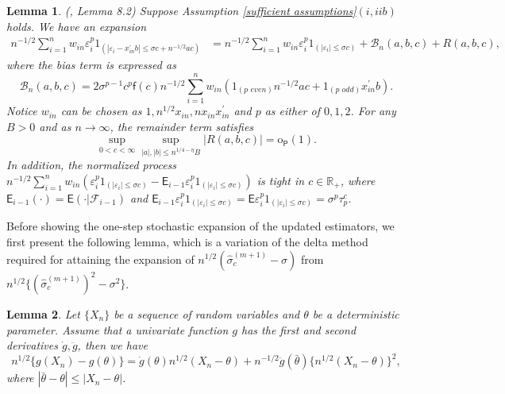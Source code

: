 \documentclass[11pt, letterpaper]{article}
\newtheorem{lemma}{Lemma}
\numberwithin{algorithm}{section}
\numberwithin{assumption}{section}
\numberwithin{lemma}{section}
\numberwithin{theorem}{section}
\numberwithin{corollary}{section}
\numberwithin{remark}{section}
\numberwithin{equation}{section}
\numberwithin{figure}{section}
\numberwithin{table}{section}
\begin{document}
\begin{lemma} \label{asymptotic expansion and tightness of two-sided empirical processes}
(\cite{jiao2020testingoutlier}, Lemma 8.2) Suppose Assumption \ref{sufficient assumptions}$(i, iib)$ holds. We have an expansion
\begin{align*}
n^{-1/2} \sum_{i=1}^{n} w_{in} \varepsilon_{i}^{p} 1_{( |\varepsilon_{i} - x_{in}^{\prime}b| \le \sigma c + n^{-1/2} a c )} & = n^{-1/2} \sum_{i=1}^{n} w_{in} \varepsilon_{i}^{p} 1_{(|\varepsilon_{i}| \le \sigma c)} + \mathcal{B}_{n}(a, b, c) + R(a, b, c),
\end{align*}
where the bias term is expressed as
\begin{equation*}
\mathcal{B}_{n}(a, b, c) = 2 \sigma^{p - 1} c^{p} \mathsf{f}(c) n^{-1/2} \sum_{i=1}^{n} w_{in} ( 1_{(p \,\, even)} n^{-1/2} a c  + 1_{(p \,\, odd)} x_{in}^{\prime} b ).
\end{equation*}
Notice $w_{in}$ can be chosen as $1, n^{1/2} x_{in}, n x_{in} x_{in}^{\prime}$ and $p$ as either of $0, 1, 2$. For any $B > 0$ and as $n \to \infty$, the remainder term satisfies
\begin{equation*}
\sup_{0 < c < \infty} \sup_{|a|, |b| \le n^{1/4 - \eta} B} |R(a, b, c)| = \mathrm{o}_{\mathsf{P}}(1).
\end{equation*}
In addition, the normalized process $n^{-1/2} \sum_{i=1}^{n} w_{in} (\varepsilon_{i}^{p} 1_{( |\varepsilon_{i}| \le \sigma c)} - \mathsf{E}_{i - 1} \varepsilon_{i}^{p} 1_{( |\varepsilon_{i}| \le \sigma c)})$ is tight in $c \in \mathbb{R}_{+}$, where $\mathsf{E}_{i - 1}(\cdot) = \mathsf{E}(\cdot | \mathcal{F}_{i - 1})$ and $\mathsf{E}_{i - 1} \varepsilon_{i}^{p} 1_{( |\varepsilon_{i}| \le \sigma c)} = \mathsf{E} \varepsilon_{i}^{p} 1_{( |\varepsilon_{i}| \le \sigma c)} = \sigma^{p} \tau_{p}^{c}$.
\end{lemma}

Before showing the one-step stochastic expansion of the updated estimators, we first present the following lemma, which is a variation of the delta method required for attaining the expansion of $n^{1/2} (\widehat{\sigma}_{c}^{(m + 1)} - \sigma)$ from $n^{1/2} \{ (\widehat{\sigma}_{c}^{(m + 1)})^{2} - \sigma^{2} \}$.

\begin{lemma} \label{variation of delta method}
Let $\{ X_{n} \}$ be a sequence of random variables and $\theta$ be a deterministic parameter. Assume that a univariate function $g$ has the first and second derivatives $\dot{g}, \ddot{g}$, then we have
\begin{equation*}
n^{1/2} \{ g(X_{n}) - g(\theta) \} = \dot{g}(\theta) n^{1/2} (X_{n} - \theta) + n^{-1/2} \ddot{g}(\bar{\theta}) \{ n^{1/2} (X_{n} - \theta) \}^{2},
\end{equation*}
where $|\bar{\theta} - \theta| \le |X_{n} - \theta|$.
\end{lemma}
\end{document}
